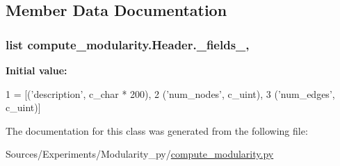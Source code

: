 \subsection{Member Data Documentation}
\hypertarget{classcompute__modularity_1_1_header_a4e36791456587ddb0232817a0ef68f24}{
\subsubsection[{\+\_\+fields\+\_\+}]{\setlength{\rightskip}{0pt plus 5cm}list compute\+\_\+modularity.\+Header.\+\_\+fields\+\_\+\hspace{0.3cm}{\ttfamily [static]}, {\ttfamily [private]}}}\label{classcompute__modularity_1_1_header_a4e36791456587ddb0232817a0ef68f24}
{\bfseries Initial value\+:}
\begin{DoxyCode}
1 = [(\textcolor{stringliteral}{'description'}, c\_char * 200),
2                 (\textcolor{stringliteral}{'num\_nodes'}, c\_uint),
3                 (\textcolor{stringliteral}{'num\_edges'}, c\_uint)]
\end{DoxyCode}


The documentation for this class was generated from the following file\+:\begin{DoxyCompactItemize}
\item 
Sources/\+Experiments/\+Modularity\+\_\+py/\hyperlink{compute__modularity_8py}{compute\+\_\+modularity.\+py}\end{DoxyCompactItemize}
